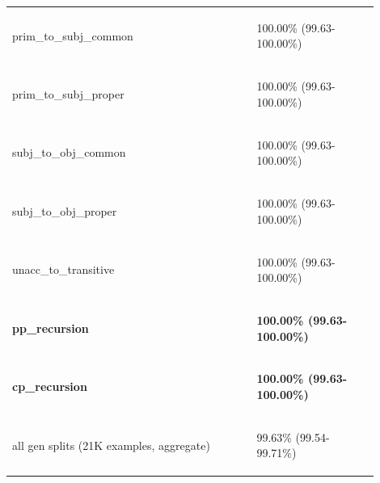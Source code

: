 \documentclass[11pt]{article}
\begin{document}
\begin{table}
\begin{tabular}{p{0.6\linewidth} p{0.3\linewidth}}
\begin{tiny}prim\_to\_subj\_common\end{tiny} & \begin{tiny} 100.00\% (99.63-100.00\%)\end{tiny} \\
\begin{tiny}prim\_to\_subj\_proper\end{tiny} & \begin{tiny} 100.00\% (99.63-100.00\%)\end{tiny} \\
\begin{tiny}subj\_to\_obj\_common\end{tiny} & \begin{tiny} 100.00\% (99.63-100.00\%)\end{tiny} \\
\begin{tiny}subj\_to\_obj\_proper\end{tiny} & \begin{tiny} 100.00\% (99.63-100.00\%)\end{tiny} \\
\begin{tiny}unacc\_to\_transitive\end{tiny} & \begin{tiny} 100.00\% (99.63-100.00\%)\end{tiny} \\
\begin{tiny}\textbf{pp\_recursion}\end{tiny} & \begin{tiny} \textbf{100.00\% (99.63-100.00\%)}\end{tiny} \\
\begin{tiny}\textbf{cp\_recursion}\end{tiny} & \begin{tiny} \textbf{100.00\% (99.63-100.00\%)}\end{tiny} \\
\hline
\begin{tiny}all gen splits (21K examples, aggregate)\end{tiny} & \begin{tiny}99.63\% (99.54-99.71\%)\end{tiny} \\

\end{tabular}
\end{table}
\end{document}
